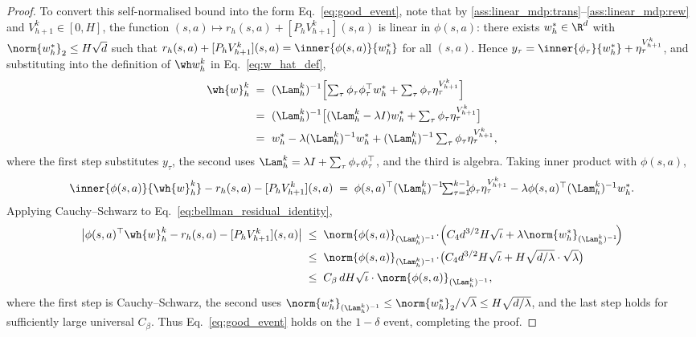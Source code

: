 \begin{proof}
To convert this self-normalised bound into the form Eq.~\eqref{eq:good_event}, note that by \ref{ass:linear_mdp:trans}--\ref{ass:linear_mdp:rew} and $V_{h+1}^k \in [0, H]$, the function $(s, a) \mapsto r_h(s, a) + [P_h V_{h+1}^k](s, a)$ is linear in $\phi(s, a)$: there exists $w_h^* \in \R^d$ with $\norm{w_h^*}_2 \le H\sqrt d$ such that $r_h(s, a) + [P_h V_{h+1}^k](s, a) = \inner{\phi(s, a)}{w_h^*}$ for all $(s, a)$. Hence $y_\tau = \inner{\phi_\tau}{w_h^*} + \eta_\tau^{V_{h+1}^k}$, and substituting into the definition of $\wh w_h^k$ in Eq.~\eqref{eq:w_hat_def},
\begin{align*}
\wh{w}_h^k
\;=\; & ~ (\Lam_h^k)^{-1} \Bigl[\textstyle\sum_\tau \phi_\tau \phi_\tau^\top w_h^* + \sum_\tau \phi_\tau \eta_\tau^{V_{h+1}^k}\Bigr] \\
\;=\; & ~ (\Lam_h^k)^{-1} \bigl[(\Lam_h^k - \lambda I) w_h^* + \textstyle\sum_\tau \phi_\tau \eta_\tau^{V_{h+1}^k}\bigr] \\
\;=\; & ~ w_h^* - \lambda (\Lam_h^k)^{-1} w_h^* + (\Lam_h^k)^{-1} \textstyle\sum_\tau \phi_\tau \eta_\tau^{V_{h+1}^k},
\end{align*}
where the first step substitutes $y_\tau$, the second uses $\Lam_h^k = \lambda I + \sum_\tau \phi_\tau \phi_\tau^\top$, and the third is algebra. Taking inner product with $\phi(s, a)$,
\begin{align}\label{eq:bellman_residual_identity}
\inner{\phi(s, a)}{\wh{w}_h^k} - r_h(s, a) - [P_h V_{h+1}^k](s, a)
\;=\; \phi(s, a)^\top (\Lam_h^k)^{-1} \!\!\textstyle\sum_{\tau=1}^{k-1}\!\! \phi_\tau \eta_\tau^{V_{h+1}^k} - \lambda \phi(s, a)^\top (\Lam_h^k)^{-1} w_h^*.
\end{align}
Applying Cauchy--Schwarz to Eq.~\eqref{eq:bellman_residual_identity},
\begin{align*}
\bigl| \phi(s,a)^\top \wh{w}_h^k - r_h(s,a) - [P_h V_{h+1}^k](s,a) \bigr|
&\;\le\; \norm{\phi(s,a)}_{(\Lam_h^k)^{-1}} \!\cdot\! \Bigl( C_4 d^{3/2} H \sqrt{\iota} + \lambda \norm{w_h^*}_{(\Lam_h^k)^{-1}} \!\Bigr) \\
&\;\le\; \norm{\phi(s,a)}_{(\Lam_h^k)^{-1}} \!\cdot\! \bigl( C_4 d^{3/2} H \sqrt{\iota} + H \sqrt{d / \lambda} \cdot \sqrt{\lambda} \bigr) \\
&\;\le\; C_\beta \, d H \sqrt{\iota} \cdot \norm{\phi(s,a)}_{(\Lam_h^k)^{-1}},
\end{align*}
where the first step is Cauchy--Schwarz, the second uses $\norm{w_h^*}_{(\Lam_h^k)^{-1}} \le \norm{w_h^*}_2 / \sqrt{\lambda} \le H \sqrt{d / \lambda}$, and the last step holds for sufficiently large universal $C_\beta$.  Thus Eq.~\eqref{eq:good_event} holds on the $1 - \delta$ event, completing the proof.
\end{proof}

